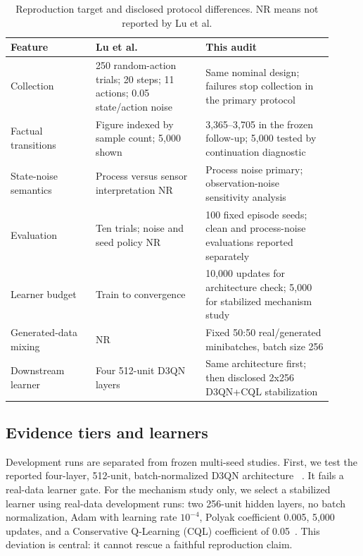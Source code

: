 \documentclass[runningheads]{llncs}
\begin{document}
\begin{table}[H]
\centering
\caption{Reproduction target and disclosed protocol differences. NR means not
reported by Lu et al.}
\label{tab:protocol-differences}
\small
\begin{tabular}{@{}p{0.24\linewidth}p{0.31\linewidth}p{0.36\linewidth}@{}}
\toprule
Feature & Lu et al. & This audit \\
\midrule
Collection & 250 random-action trials; 20 steps; 11 actions; 0.05 state/action noise
& Same nominal design; failures stop collection in the primary protocol \\
Factual transitions & Figure indexed by sample count; 5,000 shown & 3,365--3,705 in the frozen follow-up; 5,000 tested by continuation diagnostic \\
State-noise semantics & Process versus sensor interpretation NR & Process noise primary; observation-noise sensitivity analysis \\
Evaluation & Ten trials; noise and seed policy NR & 100 fixed episode seeds; clean and process-noise evaluations reported separately \\
Learner budget & Train to convergence & 10,000 updates for architecture check; 5,000 for stabilized mechanism study \\
Generated-data mixing & NR & Fixed 50:50 real/generated minibatches, batch size 256 \\
Downstream learner & Four 512-unit D3QN layers & Same architecture first; then disclosed 2x256 D3QN+CQL stabilization \\
\bottomrule
\end{tabular}
\end{table}

\subsection{Evidence tiers and learners}

Development runs are separated from frozen multi-seed studies. First, we test
the reported four-layer, 512-unit, batch-normalized D3QN architecture
~\cite{wang2016dueling,vanhasselt2016double}. It fails a real-data learner gate.
For the mechanism study only, we select a stabilized learner using real-data
development runs: two 256-unit hidden layers, no batch normalization, Adam with
learning rate $10^{-4}$, Polyak coefficient 0.005, 5,000 updates, and a
Conservative Q-Learning (CQL) coefficient of 0.05~\cite{kumar2020cql}. This
deviation is central: it cannot rescue a faithful reproduction claim.
\end{document}
